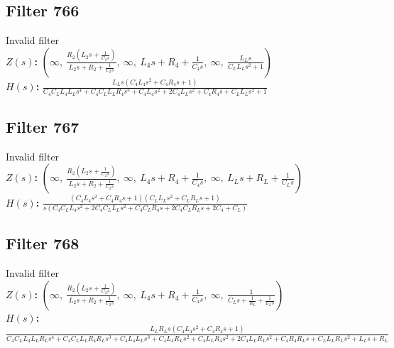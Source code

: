 \documentclass{article}
\begin{document}
\subsection*{Filter 766}
Invalid filter \\ 
\textbf{$Z(s)$:} $\left( \infty, \  \frac{R_{2} \left(L_{2} s + \frac{1}{C_{2} s}\right)}{L_{2} s + R_{2} + \frac{1}{C_{2} s}}, \  \infty, \  L_{4} s + R_{4} + \frac{1}{C_{4} s}, \  \infty, \  \frac{L_{L} s}{C_{L} L_{L} s^{2} + 1}\right)$ \\ 
\textbf{$H(s)$:} $\frac{L_{L} s \left(C_{4} L_{4} s^{2} + C_{4} R_{4} s + 1\right)}{C_{4} C_{L} L_{4} L_{L} s^{4} + C_{4} C_{L} L_{L} R_{4} s^{3} + C_{4} L_{4} s^{2} + 2 C_{4} L_{L} s^{2} + C_{4} R_{4} s + C_{L} L_{L} s^{2} + 1}$ \\ 
\subsection*{Filter 767}
Invalid filter \\ 
\textbf{$Z(s)$:} $\left( \infty, \  \frac{R_{2} \left(L_{2} s + \frac{1}{C_{2} s}\right)}{L_{2} s + R_{2} + \frac{1}{C_{2} s}}, \  \infty, \  L_{4} s + R_{4} + \frac{1}{C_{4} s}, \  \infty, \  L_{L} s + R_{L} + \frac{1}{C_{L} s}\right)$ \\ 
\textbf{$H(s)$:} $\frac{\left(C_{4} L_{4} s^{2} + C_{4} R_{4} s + 1\right) \left(C_{L} L_{L} s^{2} + C_{L} R_{L} s + 1\right)}{s \left(C_{4} C_{L} L_{4} s^{2} + 2 C_{4} C_{L} L_{L} s^{2} + C_{4} C_{L} R_{4} s + 2 C_{4} C_{L} R_{L} s + 2 C_{4} + C_{L}\right)}$ \\ 
\subsection*{Filter 768}
Invalid filter \\ 
\textbf{$Z(s)$:} $\left( \infty, \  \frac{R_{2} \left(L_{2} s + \frac{1}{C_{2} s}\right)}{L_{2} s + R_{2} + \frac{1}{C_{2} s}}, \  \infty, \  L_{4} s + R_{4} + \frac{1}{C_{4} s}, \  \infty, \  \frac{1}{C_{L} s + \frac{1}{R_{L}} + \frac{1}{L_{L} s}}\right)$ \\ 
\textbf{$H(s)$:} $\frac{L_{L} R_{L} s \left(C_{4} L_{4} s^{2} + C_{4} R_{4} s + 1\right)}{C_{4} C_{L} L_{4} L_{L} R_{L} s^{4} + C_{4} C_{L} L_{L} R_{4} R_{L} s^{3} + C_{4} L_{4} L_{L} s^{3} + C_{4} L_{4} R_{L} s^{2} + C_{4} L_{L} R_{4} s^{2} + 2 C_{4} L_{L} R_{L} s^{2} + C_{4} R_{4} R_{L} s + C_{L} L_{L} R_{L} s^{2} + L_{L} s + R_{L}}$ \\ 
\end{document}
